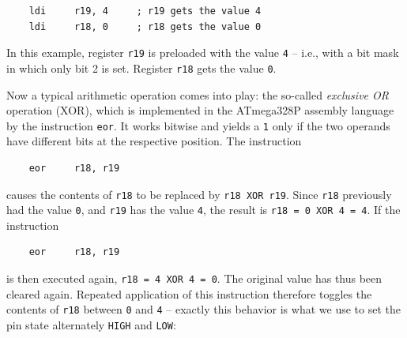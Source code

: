 \documentclass[a4paper,12pt]{article}
\begin{document}
\begin{lstlisting}
    ldi     r19, 4     ; r19 gets the value 4
    ldi     r18, 0     ; r18 gets the value 0
\end{lstlisting}

\noindent
In this example, register \texttt{r19} is preloaded with the value
\texttt{4} – i.e., with a bit mask in which only bit 2 is set. Register
\texttt{r18} gets the value \texttt{0}.

Now a typical arithmetic operation comes into play: the so-called
\emph{exclusive OR} operation (XOR), which is implemented in the ATmega328P
assembly language by the instruction \texttt{eor}. It works bitwise and
yields a \texttt{1} only if the two operands have different bits at the
respective position. The instruction

\begin{lstlisting}
    eor     r18, r19
\end{lstlisting}

\noindent
causes the contents of \texttt{r18} to be replaced by \texttt{r18 XOR r19}.
Since \texttt{r18} previously had the value \texttt{0}, and \texttt{r19} has
the value \texttt{4}, the result is \texttt{r18 = 0 XOR 4 = 4}.
If the instruction

\begin{lstlisting}
    eor     r18, r19
\end{lstlisting}

\noindent
is then executed again, \texttt{r18 = 4 XOR 4 = 0}. The original value has
thus been cleared again. Repeated application of this instruction therefore
toggles the contents of \texttt{r18} between \texttt{0} and \texttt{4} –
exactly this behavior is what we use to set the pin state alternately
\texttt{HIGH} and \texttt{LOW}:

\begin{center}
\begin{minipage}{0.42\textwidth}
\end{minipage}
\hfill
\begin{minipage}{0.42\textwidth}
\end{minipage}
\end{center}
\end{document}
